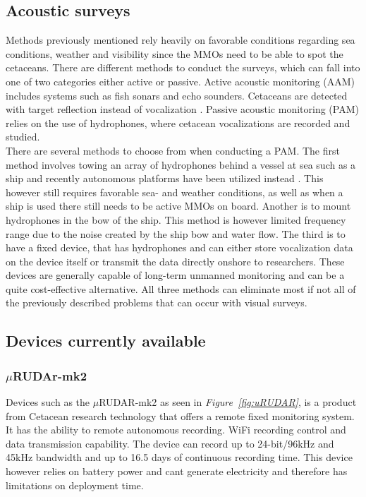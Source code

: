 \subsection{Acoustic surveys}

Methods previously mentioned rely heavily on favorable conditions regarding sea conditions, weather and visibility since the MMOs need to be able to spot the cetaceans.
There are different methods to conduct the surveys, which can fall into one of two categories either active or passive.
Active acoustic monitoring (AAM) includes systems such as fish sonars and echo sounders. 
Cetaceans are detected with target reflection instead of vocalization \cite{pyc_evaluation_2015}.
Passive acoustic monitoring (PAM) relies on the use of hydrophones, where cetacean vocalizations are recorded and studied.\\
\indent There are several methods to choose from when conducting a PAM.
The first method involves towing an array of hydrophones behind a vessel at sea such as a ship and recently autonomous platforms have been utilized instead\cite{baumgartner_diel_2008} .
This however still requires favorable sea- and weather conditions, as well as when a ship is used there still needs to be active MMOs on board.
Another is to mount hydrophones in the bow of the ship.
This method is however limited frequency range due to the noise created by the ship bow and water flow\cite{rankin_acoustic_2008}.
The third is to have a fixed device, that has hydrophones and can either store vocalization data on the device itself or transmit the data directly onshore to researchers.
These devices are generally capable of long-term unmanned monitoring and can be a quite cost-effective alternative.
All three methods can eliminate most if not all of the previously described problems that can occur with visual surveys.



\subsection{Devices currently available}
\subsubsection{$\mu$RUDAr-mk2}

Devices such as the $\mu$RUDAR-mk2 as seen in \textit{Figure~\ref{fig:uRUDAR}}, is a product from Cetacean research technology that offers a remote fixed monitoring system.
It has the ability to remote autonomous recording.
WiFi recording control and data transmission capability.
The device can record up to 24-bit/96kHz and 45kHz bandwidth and up to 16.5 days of continuous recording time\cite{computing_microrudar_nodate}.
This device however relies on battery power and cant generate electricity and therefore has limitations on deployment time.

